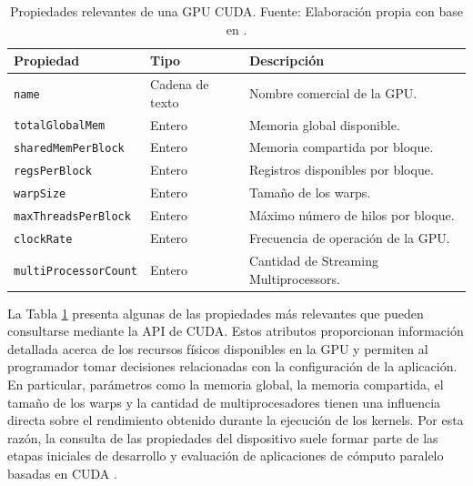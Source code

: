 \begin{table}[H]
\centering
\caption{Propiedades relevantes de una GPU CUDA. Fuente: Elaboración propia con base en \cite{deviceProperties,nvidiaDeviceBlog}.}
\label{tab:propiedades_cuda}
\begin{tabular}{|p{4cm}|p{3cm}|p{6cm}|}
\hline
\textbf{Propiedad} & \textbf{Tipo} & \textbf{Descripción} \\
\hline
\texttt{name} & Cadena de texto & Nombre comercial de la GPU. \\
\hline
\texttt{totalGlobalMem} & Entero & Memoria global disponible. \\
\hline
\texttt{sharedMemPerBlock} & Entero & Memoria compartida por bloque. \\
\hline
\texttt{regsPerBlock} & Entero & Registros disponibles por bloque. \\
\hline
\texttt{warpSize} & Entero & Tamaño de los warps. \\
\hline
\texttt{maxThreadsPerBlock} & Entero & Máximo número de hilos por bloque. \\
\hline
\texttt{clockRate} & Entero & Frecuencia de operación de la GPU. \\
\hline
\texttt{multiProcessorCount} & Entero & Cantidad de Streaming Multiprocessors. \\
\hline
\end{tabular}
\end{table}

La Tabla \ref{tab:propiedades_cuda} presenta algunas de las propiedades más relevantes que pueden consultarse mediante la API de CUDA. Estos atributos proporcionan información detallada acerca de los recursos físicos disponibles en la GPU y permiten al programador tomar decisiones relacionadas con la configuración de la aplicación. En particular, parámetros como la memoria global, la memoria compartida, el tamaño de los warps y la cantidad de multiprocesadores tienen una influencia directa sobre el rendimiento obtenido durante la ejecución de los kernels. Por esta razón, la consulta de las propiedades del dispositivo suele formar parte de las etapas iniciales de desarrollo y evaluación de aplicaciones de cómputo paralelo basadas en CUDA \cite{deviceProperties,nvidiaDeviceBlog}.
